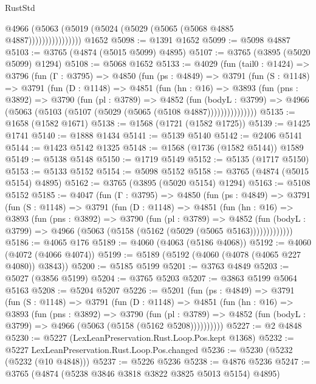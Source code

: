\begin{lexlean}{RustStd}
\begin{coremodule}
                      @4966 (@5063 (@5019 (@5024 (@5029 (@5065 (@5068 @4885 @4887))))))))))))))))
    @1652
@5098 := @1391 @1652
@5099 := @5098 @4887
@5103 := @3765 (@4874 (@5015 @5099) @4895)
@5107 := @3765 (@3895 (@5020 @5099) @1294)
@5108 := @5068 @1652
@5133 := @4029
    (fun (tail0 : @1424) =>
    @3796
      (fun (Γ : @3795) =>
      @4850
        (fun (ps : @4849) =>
        @3791
          (fun (S : @1148) =>
          @3791
            (fun (D : @1148) =>
            @4851
              (fun (hn : @16) =>
              @3893
                (fun (pns : @3892) =>
                @3790
                  (fun (pl : @3789) =>
                  @4852
                    (fun (bodyL : @3799) =>
                    @4966 (@5063 (@5103 (@5107 (@5029 (@5065 (@5108 @4887)))))))))))))))
@5135 := @1658 (@1582 @1671)
@5138 := @1568 (@1721 (@1582 @1725))
@5139 := @1425 @1741
@5140 := @1888 @1434
@5141 := @5139 @5140
@5142 := @2406 @5141
@5144 := @1423 @5142 @1325
@5148 := @1568 (@1736 (@1582 @5144)) @1589
@5149 := @5138 @5148
@5150 := @1719 @5149
@5152 := @5135 (@1717 @5150)
@5153 := @5133 @5152
@5154 := @5098 @5152
@5158 := @3765 (@4874 (@5015 @5154) @4895)
@5162 := @3765 (@3895 (@5020 @5154) @1294)
@5163 := @5108 @5152
@5185 := @4047
    (fun (Γ : @3795) =>
    @4850
      (fun (ps : @4849) =>
      @3791
        (fun (S : @1148) =>
        @3791
          (fun (D : @1148) =>
          @4851
            (fun (hn : @16) =>
            @3893
              (fun (pns : @3892) =>
              @3790
                (fun (pl : @3789) =>
                @4852
                  (fun (bodyL : @3799) =>
                  @4966 (@5063 (@5158 (@5162 (@5029 (@5065 @5163)))))))))))))
@5186 := @4065 @176
@5189 := @4060 (@4063 (@5186 @4068))
@5192 := @4060 (@4072 (@4066 @4074))
@5199 := @5189 (@5192 (@4060 (@4078 (@4065 @227 @4080)) @3843))
@5200 := @5185 @5199
@5201 := @3763 @4849
@5203 := @5027 (@3856 @5199)
@5204 := @3765 @5203
@5207 := @3863 @5199 @5064 @5163
@5208 := @5204 @5207
@5226 := @5201
    (fun (ps : @4849) =>
    @3791
      (fun (S : @1148) =>
      @3791
        (fun (D : @1148) =>
        @4851
          (fun (hn : @16) =>
          @3893
            (fun (pns : @3892) =>
            @3790
              (fun (pl : @3789) =>
              @4852 (fun (bodyL : @3799) => @4966 (@5063 (@5158 (@5162 @5208))))))))))
@5227 := @2 @4848
@5230 := @5227 (LexLeanPreservation.Rust.Loop.Pos.kept @1368)
@5232 := @5227 LexLeanPreservation.Rust.Loop.Pos.changed
@5236 := @5230 (@5232 (@5232 (@10 @4848)))
@5237 := @5226 @5236
@5238 := @4876 @5236
@5247 := @3765 (@4874 (@5238 @3846 @3818 @3822 @3825 @5013 @5154) @4895)

\end{coremodule}
\end{lexlean}
